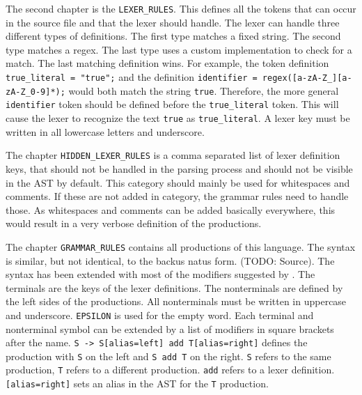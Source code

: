 The second chapter is the \verb|LEXER_RULES|. 
This defines all the tokens that can occur in the source file and that the lexer should handle. 
The lexer can handle three different types of definitions. 
The first type matches a fixed string. The second type matches a regex. 
The last type uses a custom implementation to check for a match. 
The last matching definition wins. 
For example, the token definition \verb|true_literal = "true";| and the definition \verb|identifier = regex([a-zA-Z_][a-zA-Z_0-9]*);| would both match the string \verb|true|. 
Therefore, the more general \verb|identifier| token should be defined before the \verb|true_literal| token. 
This will cause the lexer to recognize the text \verb|true| as \verb|true_literal|. 
A lexer key must be written in all lowercase letters and underscore.

The chapter \verb|HIDDEN_LEXER_RULES| is a comma separated list of lexer definition keys, 
that should not be handled in the parsing process and should not be visible in the AST by default.
This category should mainly be used for whitespaces and comments. If these are not added in category, the grammar rules need to handle those.
As whitespaces and comments can be added basically everywhere, this would result in a very verbose definition of the productions.

The chapter \verb|GRAMMAR_RULES| contains all productions of this language. The syntax is similar, but not identical, to the backus natus form. (TODO: Source). The syntax has been extended with most of the modifiers suggested by \cite{GeneratingRewritableAST}. The terminals are the keys of the lexer definitions. The nonterminals are defined by the left sides of the productions. All nonterminals must be written in uppercase and underscore. \verb|EPSILON| is used for the empty word. Each terminal and nonterminal symbol can be extended by a list of modifiers in square brackets after the name. 
\verb|S -> S[alias=left] add T[alias=right]| defines the production with \verb|S| on the left and \verb|S add T| on the right. 
\verb|S| refers to the same production, \verb|T| refers to a different production. 
\verb|add| refers to a lexer definition. 
\verb|[alias=right]| sets an alias in the AST for the \verb|T| production.